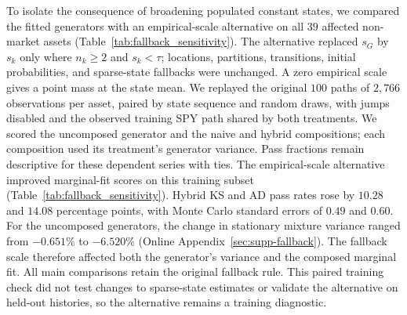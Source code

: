 To isolate the consequence of broadening populated constant states,
we compared the fitted generators with an empirical-scale alternative
on all $39$ affected non-market assets
(Table~\ref{tab:fallback_sensitivity}). The alternative replaced
$s_G$ by $s_k$ only where $n_k\ge2$ and $s_k<\tau$; locations,
partitions, transitions, initial probabilities, and sparse-state
fallbacks were unchanged. A zero empirical scale gives a point mass
at the state mean.
We replayed the original $100$ paths of $2{,}766$ observations per
asset, paired by state sequence and random draws, with jumps disabled
and the observed training SPY path shared by both treatments.  We scored
the uncomposed generator and the naive and hybrid compositions;
each composition used its treatment's generator variance.  Pass fractions remain descriptive for these dependent series with ties.
The empirical-scale alternative improved marginal-fit scores on this
training subset (Table~\ref{tab:fallback_sensitivity}). Hybrid KS and AD pass rates rose by $10.28$ and $14.08$ percentage points, with Monte Carlo standard errors of $0.49$ and $0.60$. For the uncomposed
generators, the change in stationary mixture variance ranged from
$-0.651\%$ to $-6.520\%$ (Online Appendix~\ref{sec:supp-fallback}). The
fallback scale therefore affected both the generator's variance and
the composed marginal fit. All main comparisons retain the original
fallback rule. This paired training check did not test changes to
sparse-state estimates or validate the alternative on held-out
histories, so the alternative remains a training diagnostic.

\begin{table}[H]
 \centering
 \caption{\textbf{Paired sensitivity to the scale of populated constant states.}
 Each treatment used $100$ paired training-length paths for each of
 the same $39$ affected assets. Entries are means over these fixed
 assets and replications. The empirical-scale treatment changes only
 populated near-constant states, retaining the sparse-state fallback.
 Kolmogorov--Smirnov (KS) and Anderson--Darling (AD) pass fractions
 use $p>0.05$; their changes are percentage points. $W_1$ is the
 Wasserstein-1 distance to observed growth rates. Variance / observed
 divides each path's variance by its asset's observed training
 variance. ACF-MAE$_{25}$ is the mean absolute difference between
 each path's absolute-return autocorrelation function and the observed
 function over lags $1$--$25$, calculated before averaging paths.
 Paired change subtracts the fitted value from the empirical-scale
 value. Standard errors (SE) use the $100$ replication-level mean
 paired changes over the fixed asset set and describe simulation
 uncertainty, not uncertainty across historical markets.}
 \label{tab:fallback_sensitivity}
 \footnotesize
 \setlength{\tabcolsep}{4pt}
 
\end{table}
